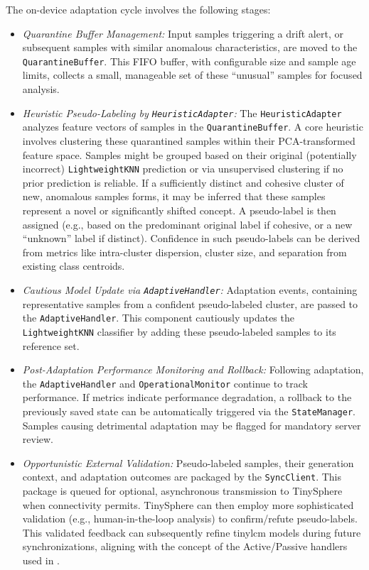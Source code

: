 The on-device adaptation cycle involves the following stages:
\begin{itemize}
    \item \textit{Quarantine Buffer Management:} Input samples triggering a drift alert, or subsequent samples with similar anomalous characteristics, are moved to the \texttt{QuarantineBuffer}. This FIFO buffer, with configurable size and sample age limits, collects a small, manageable set of these ``unusual'' samples for focused analysis.
    \item \textit{Heuristic Pseudo-Labeling by \texttt{HeuristicAdapter}:} The \texttt{HeuristicAdapter} analyzes feature vectors of samples in the \texttt{QuarantineBuffer}. A core heuristic involves clustering these quarantined samples within their PCA-transformed feature space. Samples might be grouped based on their original (potentially incorrect) \texttt{LightweightKNN} prediction or via unsupervised clustering if no prior prediction is reliable. If a sufficiently distinct and cohesive cluster of new, anomalous samples forms, it may be inferred that these samples represent a novel or significantly shifted concept. A pseudo-label is then assigned (e.g., based on the predominant original label if cohesive, or a new ``unknown'' label if distinct). Confidence in such pseudo-labels can be derived from metrics like intra-cluster dispersion, cluster size, and separation from existing class centroids.
    \item \textit{Cautious Model Update via \texttt{AdaptiveHandler}:} Adaptation events, containing representative samples from a confident pseudo-labeled cluster, are passed to the \texttt{AdaptiveHandler}. This component cautiously updates the \texttt{LightweightKNN} classifier by adding these pseudo-labeled samples to its reference set.
    \item \textit{Post-Adaptation Performance Monitoring and Rollback:} Following adaptation, the \texttt{AdaptiveHandler} and \texttt{OperationalMonitor} continue to track performance. If metrics indicate performance degradation, a rollback to the previously saved state can be automatically triggered via the \texttt{StateManager}. Samples causing detrimental adaptation may be flagged for mandatory server review.
    \item \textit{Opportunistic External Validation:} Pseudo-labeled samples, their generation context, and adaptation outcomes are packaged by the \texttt{SyncClient}. This package is queued for optional, asynchronous transmission to TinySphere when connectivity permits. TinySphere can then employ more sophisticated validation (e.g., human-in-the-loop analysis) to confirm/refute pseudo-labels. This validated feedback can subsequently refine \gls{tinylcm} models during future synchronizations, aligning with the concept of the Active/Passive handlers used in \cite{disabatoIncrementalOnDeviceTiny2020,disabatoTinyMachineLearning2024}.
\end{itemize}


